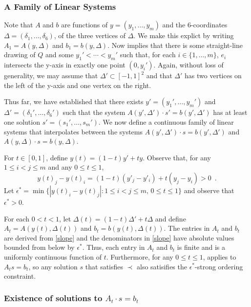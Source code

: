 \documentclass{patmorin}
\begin{document}
\subsubsection{A Family of Linear Systems}

   Note that $A$ and $b$ are functions of $y=(y_1,\ldots,y_m)$
   and the 6-coordinates $\Delta=(\delta_1,\ldots,\delta_6)$, of
   the three vertices of $\Delta$.  We make this explict by writing
   $A_1=A(y,\Delta)$ and $b_1=b(y,\Delta)$.  Now 
   implies that there is some straight-line drawing of $Q$ and some
   $y_1'<\cdots< y_m'$ such that, for each $i\in\{1,\ldots,m\}$, $e_i$
   intersects the y-axis in exactly one point $(0,y_i')$.  Again, without loss
   of generality, we may assume that $\Delta'\subset [-1,1]^2$ and that
   $\Delta'$ has two vertices on the left of the y-axis and one vertex
   on the right.

   Thus far, we have established that there exists $y'=(y_1',\ldots,y_m')$
   and $\Delta'=(\delta_1',\ldots,\delta_6')$ such that the
   system $A(y',\Delta')\cdot s' = b(y',\Delta')$ has at least one
   solution $s'=(s_1',\ldots,s_m')$.  We now define a continuous
   family of linear systems that interpolates between the systems
   $A(y',\Delta')\cdot s=b(y',\Delta')$ and $A(y,\Delta)\cdot s=b(y,\Delta)$.

   For $t\in[0,1]$, define $y(t) = (1-t)y' + ty$.
   Observe that, for any $1\le i< j\le m$ and any $0\le t\le 1$,
   \[
       y(t)_j - y(t)_i = (1-t)(y'_j-y'_i) + t(y_j-y_i) > 0 \enspace .
   \]
   Let $\epsilon^*=\min\{|y(t)_i-y(t)_j| : 1\le i< j\le m,\, 0\le t\le 1\}$
   and observe that $\epsilon^* >0$.

   For each $0< t<1$, let $\Delta(t)=(1-t)\Delta' + t\Delta$ and define
   $A_t=A(y(t),\Delta(t))$ and $b_t=b(y(t),\Delta(t))$.  The entries in
   $A_t$ and $b_t$ are derived from \eqref{slope} and the denominators in
   \eqref{slope} have absolute values bounded from below by $\epsilon^*$.
   Thus, each entry in $A_t$ and $b_t$ is finite and is a uniformly
   continuous function of $t$.  Furthermore, for any $0\le t\le 1$,
    applies to $A_ts =b_t$, so any solution
   $s$ that satisfies $\prec$ also satisifies the $\epsilon^*$-strong
   ordering constraint.

\subsubsection{Existence of solutions to $A_t\cdot s=b_t$}
\end{document}
